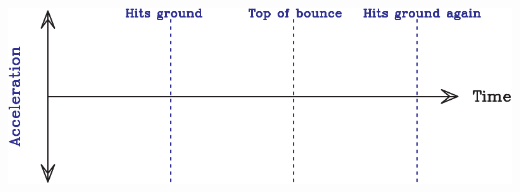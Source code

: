 \documentclass[12pt]{article}
\begin{document}
\begin{enumerate}
\begin{center}
	\vspace{0.4in}
	
	\includegraphics[width=\textwidth]{acceleration-crop.pdf}
\end{center}
\vspace{1in}








\newpage




\end{enumerate}
\end{document}
